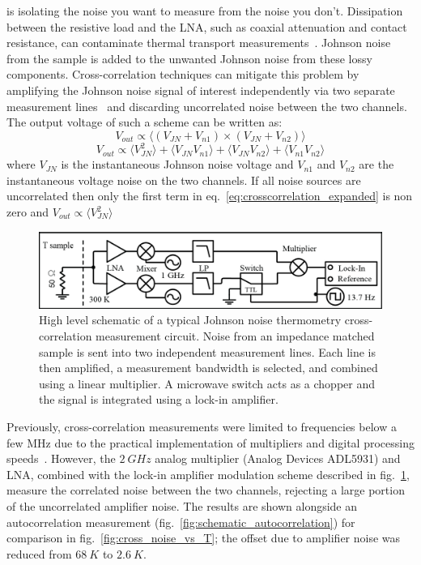  is isolating the noise you want to measure from the noise you don't. Dissipation between the resistive load and the LNA, such as coaxial attenuation and contact resistance, can contaminate thermal transport measurements~\cite{white_status_1996, Glattli:1997}. Johnson noise from the sample is added to the unwanted Johnson noise from these lossy components. Cross-correlation techniques can mitigate this problem by amplifying the Johnson noise signal of interest independently via two separate measurement lines~\cite{Glattli:1997p7350, DiCarlo:2006p2620, Henny:1999p2790, Brophy:1965p2623, *Klein:1978p2616} and discarding uncorrelated noise between the two channels. The output voltage of such a scheme can be written as:
\begin{equation}
V_{out}\propto\langle\left(V_{JN}+V_{n1}\right)\times\left(V_{JN}+V_{n2}\right)\rangle 
\end{equation}
\begin{equation}\label{eq:crosscorrelation_expanded}
V_{out}\propto\langle V_{JN}^2\rangle + \langle V_{JN}V_{n1}\rangle+\langle V_{JN}V_{n2}\rangle+\langle V_{n1}V_{n2}\rangle
\end{equation}
where $V_{JN}$ is the instantaneous Johnson noise voltage and $V_{n1}$ and $V_{n2}$ are the instantaneous voltage noise on the two channels. If all noise sources are uncorrelated then only the first term in eq.~\ref{eq:crosscorrelation_expanded} is non zero and ${V_{out}\propto\langle V_{JN}^2\rangle}$
\begin{figure}
\centering
\includegraphics[width=\textwidth]{figures/Johnson_noise_thermometry/Schematic_Crosscorrelation.png}
\caption[JNT crosscorrelation schematic]{High level schematic of a typical Johnson noise thermometry cross-correlation measurement circuit. Noise from an impedance matched sample is sent into two independent measurement lines. Each line is then amplified, a measurement bandwidth is selected, and combined using a linear multiplier. A microwave switch acts as a chopper and the signal is integrated using a lock-in amplifier.}
\label{fig:schematic_crosscorrelation}
\end{figure}
Previously, cross-correlation measurements were limited to frequencies below a few MHz due to the practical implementation of multipliers and digital processing speeds~\cite{Brophy:1965p2623, *Klein:1978p2616, Sampietro:2000p2679, DiCarlo:2006p2620}. However, the $2~GHz$ analog multiplier (Analog Devices ADL5931) and LNA, combined with the lock-in amplifier modulation scheme described in fig.~\ref{fig:schematic_crosscorrelation}, measure the correlated noise between the two channels, rejecting a large portion of the uncorrelated amplifier noise. The results are shown alongside an autocorrelation measurement (fig.~\ref{fig:schematic_autocorrelation}) for comparison in fig.~\ref{fig:cross_noise_vs_T}; the offset due to amplifier noise was reduced from $68~K$ to $2.6~K$.

